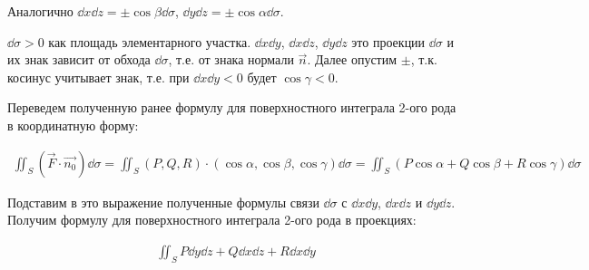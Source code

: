 Аналогично \(\dd x \dd z = \pm \cos \beta \dd \sigma\),
\(\dd y \dd z = \pm \cos \alpha \dd \sigma\).

\begin{remark}
  \(\dd \sigma > 0\) как площадь элементарного участка. \(\dd x \dd y\),
  \(\dd x \dd z\), \(\dd y \dd z\) это проекции \(\dd \sigma\) и их знак
  зависит от обхода \(\dd \sigma\), т.е. от знака нормали \(\vec{n}\). Далее
  опустим \(\pm\), т.к. косинус учитывает знак, т.е. при \(\dd x \dd y < 0\)
  будет \(\cos \gamma < 0\).
\end{remark}

Переведем полученную ранее формулу для поверхностного интеграла 2-ого рода в
координатную форму:

\begin{align*}\label{surf-int-coords}\tag{SIC}
  \iint_{S} (\vec{F} \cdot \vec{n_{0}}) \dd \sigma
  = \iint_{S} (P, Q, R) \cdot (\cos \alpha, \cos \beta, \cos \gamma) \dd \sigma
  = \iint_{S} (P \cos \alpha + Q \cos \beta + R \cos \gamma) \dd \sigma
\end{align*}

Подставим в это выражение полученные формулы связи \(\dd \sigma\) с
\(\dd x \dd y\), \(\dd x \dd z\) и \(\dd y \dd z\). Получим формулу для
поверхностного интеграла 2-ого рода в проекциях:

\begin{align*}\label{surf-int-proj}\tag{SIP}
  \iint_{S} P \dd y \dd z + Q \dd x \dd z + R \dd x \dd y
\end{align*}